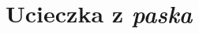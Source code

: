\documentclass[aspectratio=169]{beamer}
\begin{document}
\begin{frame}
  \begin{figure}
    	{\escapeFromHalfplaneConvPlotTex}
  \end{figure}
\end{frame}

\begin{frame}
  \begin{figure}
    	{\escapeFromHalfplanePointTex}
  \end{figure}
\end{frame}

\section{Ucieczka z \textit{paska}}

\begin{frame}
  \begin{figure}
    	{\escapeFromStripTex}
  \end{figure}
\end{frame}

\begin{frame}
  \begin{figure}
    	{\escapeFromStripConvPlotTex}
  \end{figure}
\end{frame}
\end{document}
